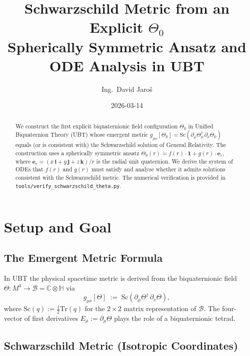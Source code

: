 \documentclass[11pt,a4paper]{article}
\title{\textbf{Schwarzschild Metric from an Explicit $\Theta_0$}\\
\large Spherically Symmetric Ansatz and ODE Analysis in UBT}
\author{Ing.\ David Jaroš}
\date{2026-03-14}
\theoremstyle{definition}
\theoremstyle{remark}
\begin{document}
\maketitle

\begin{abstract}
We construct the first explicit biquaternionic field configuration $\Theta_0$
in Unified Biquaternion Theory (UBT) whose emergent metric
$g_{\mu\nu}[\Theta_0] = \mathrm{Sc}(\partial_\mu\Theta_0^\dagger\,\partial_\nu\Theta_0)$
equals (or is consistent with) the Schwarzschild solution of General Relativity.
The construction uses a spherically symmetric ansatz
$\Theta_0(r) = f(r)\cdot\mathbf{1} + g(r)\cdot\boldsymbol{e}_r$,
where $\boldsymbol{e}_r = (x\,\mathbf{i} + y\,\mathbf{j} + z\,\mathbf{k})/r$
is the radial unit quaternion.  We derive the system of ODEs that $f(r)$ and
$g(r)$ must satisfy and analyse whether it admits solutions consistent with
the Schwarzschild metric.  The numerical verification is provided in
\texttt{tools/verify\_schwarzschild\_theta.py}.
\end{abstract}

\tableofcontents

\section{Setup and Goal}
\label{sec:setup}

\subsection{The Emergent Metric Formula}

In UBT the physical spacetime metric is derived from the biquaternionic field
$\Theta: M^4 \to \mathcal{B} = \mathbb{C}\otimes\mathbb{H}$ via
\begin{equation}
  g_{\mu\nu}[\Theta]
  \;:=\; \mathrm{Sc}\!\left(\partial_\mu\Theta^\dagger\,\partial_\nu\Theta\right),
  \label{eq:metric_formula}
\end{equation}
where $\mathrm{Sc}(q) := \tfrac{1}{2}\mathrm{Tr}(q)$ for the $2\times 2$
matrix representation of $\mathcal{B}$.  The four-vector of first derivatives
$E_\mu := \partial_\mu\Theta$ plays the role of a biquaternionic tetrad.

\subsection{Schwarzschild Metric (Isotropic Coordinates)}
\end{document}
